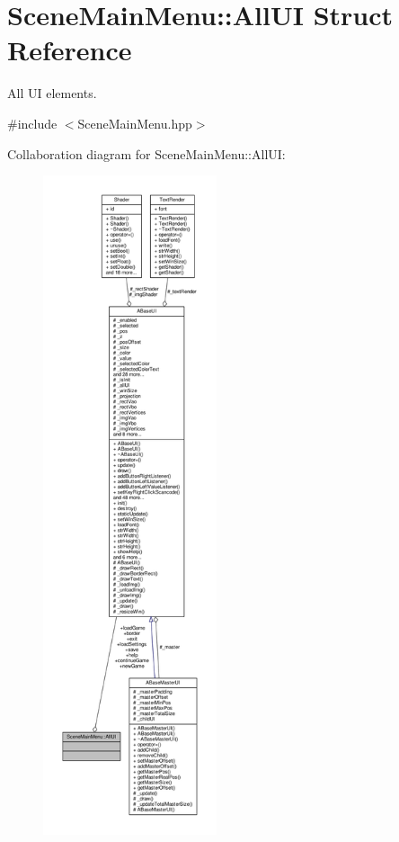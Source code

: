 \hypertarget{struct_scene_main_menu_1_1_all_u_i}{}\section{Scene\+Main\+Menu\+:\+:All\+UI Struct Reference}
\label{struct_scene_main_menu_1_1_all_u_i}


All UI elements.  




{\ttfamily \#include $<$Scene\+Main\+Menu.\+hpp$>$}



Collaboration diagram for Scene\+Main\+Menu\+:\+:All\+UI\+:
\nopagebreak
\begin{figure}[H]
\begin{center}
\leavevmode
\includegraphics[height=550pt]{struct_scene_main_menu_1_1_all_u_i__coll__graph}
\end{center}
\end{figure}
